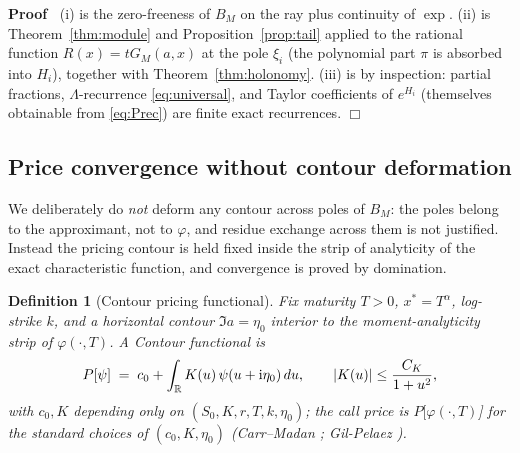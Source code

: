 \documentclass{article}
\newcommand{\cdummy}{\cdot}
\newcommand{\tmem}[1]{{\em #1\/}}
\newenvironment{proof}{\noindent\textbf{Proof\ }}{\hspace*{\fill}$\Box$\medskip}
\newtheorem{definition}{Definition}
\newcommand{\R}{\mathbb{R}}
\begin{document}
\begin{proof}
  (i) is the zero-freeness of $B_M$ on the ray plus continuity of $\exp$. (ii)
  is Theorem~\ref{thm:module} and Proposition~\ref{prop:tail} applied to the
  rational function $R (x) = tG_M (a, x)$ at the pole $\xi_i$ (the polynomial
  part $\pi$ is absorbed into $H_i$), together with
  Theorem~\ref{thm:holonomy}. (iii) is by inspection: partial fractions,
  $\Lambda$-recurrence \eqref{eq:universal}, and Taylor coefficients of
  $e^{H_i}$ (themselves obtainable from \eqref{eq:Prec}) are finite exact
  recurrences.
\end{proof}

\subsection{Price convergence without contour deformation}

We deliberately do {\tmem{not}} deform any contour across poles of $B_M$: the
poles belong to the approximant, not to $\varphi$, and residue exchange across
them is not justified. Instead the pricing contour is held fixed inside the
strip of analyticity of the exact characteristic function, and convergence is
proved by domination.

\begin{definition}
  [Contour pricing functional]\label{def:contour} Fix maturity $T > 0$,
  $x^{\ast} = T^{\alpha}$, log-strike $k$, and a horizontal contour $\Im a =
  \eta_0$ interior to the moment-analyticity strip of $\varphi (\cdummy, T)$.
  A {\tmem{Contour functional}} is
  \[ P [\psi] \hspace{0.27em} = \hspace{0.27em} c_0 + \int_{\R} K (u) 
     \hspace{0.17em} \psi (u + \mathrm{i} \eta_0)  \hspace{0.17em} du, \qquad
     |K (u) | \le \frac{C_K}{1 + u^2}, \]
  with $c_0, K$ depending only on $(S_0, K, r, T, k, \eta_0)$; the call price
  is $P [\varphi (\cdot, T)$] for the standard choices of $(c_0, K, \eta_0)$
  {\tmem{(Carr--Madan {\cite{CarrMadan}}; Gil-Pelaez
  {\cite{GilPelaez}})}}.
\end{definition}
\end{document}

